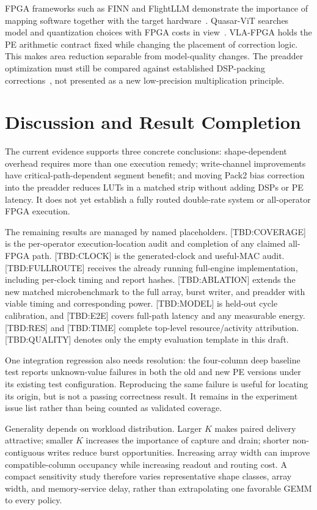 \documentclass[10pt,conference,letterpaper]{IEEEtran}
\newcommand{\pending}[1]{\textcolor{red!65!black}{\textsf{[TBD:#1]}}}
\begin{document}
FPGA frameworks such as FINN and FlightLLM demonstrate the importance of mapping software together with the target hardware~\cite{finn,flight}. Quasar-ViT searches model and quantization choices with FPGA costs in view~\cite{quasar}. VLA-FPGA holds the PE arithmetic contract fixed while changing the placement of correction logic. This makes area reduction separable from model-quality changes. The preadder optimization must still be compared against established DSP-packing corrections~\cite{packing}, not presented as a new low-precision multiplication principle.

\section{Discussion and Result Completion}
\label{sec:status}
The current evidence supports three concrete conclusions: shape-dependent overhead requires more than one execution remedy; write-channel improvements have critical-path-dependent segment benefit; and moving Pack2 bias correction into the preadder reduces LUTs in a matched strip without adding DSPs or PE latency. It does not yet establish a fully routed double-rate system or all-operator FPGA execution.

The remaining results are managed by named placeholders. \pending{COVERAGE} is the per-operator execution-location audit and completion of any claimed all-FPGA path. \pending{CLOCK} is the generated-clock and useful-MAC audit. \pending{FULLROUTE} receives the already running full-engine implementation, including per-clock timing and report hashes. \pending{ABLATION} extends the new matched microbenchmark to the full array, burst writer, and preadder with viable timing and corresponding power. \pending{MODEL} is held-out cycle calibration, and \pending{E2E} covers full-path latency and any measurable energy. \pending{RES} and \pending{TIME} complete top-level resource/activity attribution. \pending{QUALITY} denotes only the empty evaluation template in this draft.

One integration regression also needs resolution: the four-column deep baseline test reports unknown-value failures in both the old and new PE versions under its existing test configuration. Reproducing the same failure is useful for locating its origin, but is not a passing correctness result. It remains in the experiment issue list rather than being counted as validated coverage.

Generality depends on workload distribution. Larger $K$ makes paired delivery attractive; smaller $K$ increases the importance of capture and drain; shorter non-contiguous writes reduce burst opportunities. Increasing array width can improve compatible-column occupancy while increasing readout and routing cost. A compact sensitivity study therefore varies representative shape classes, array width, and memory-service delay, rather than extrapolating one favorable GEMM to every policy.
\end{document}
